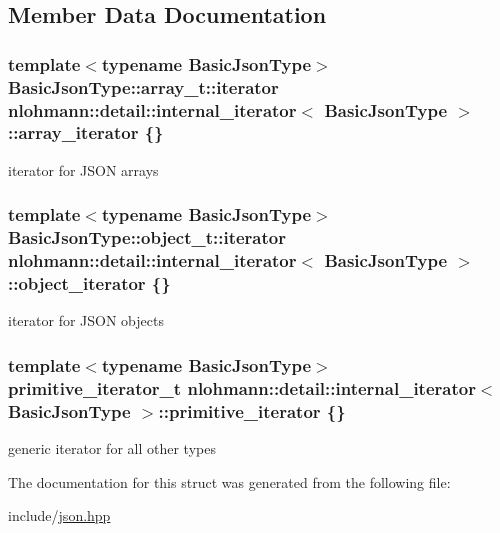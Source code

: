 \subsection{Member Data Documentation}
\subsubsection[{\texorpdfstring{array\+\_\+iterator}{array_iterator}}]{\setlength{\rightskip}{0pt plus 5cm}template$<$typename Basic\+Json\+Type$>$ Basic\+Json\+Type\+::array\+\_\+t\+::iterator {\bf nlohmann\+::detail\+::internal\+\_\+iterator}$<$ Basic\+Json\+Type $>$\+::array\+\_\+iterator \{\}}\hypertarget{structnlohmann_1_1detail_1_1internal__iterator_a8294a6e6f01b58e1cce8fbae66a50b5d}{}\label{structnlohmann_1_1detail_1_1internal__iterator_a8294a6e6f01b58e1cce8fbae66a50b5d}


iterator for J\+S\+ON arrays 

\subsubsection[{\texorpdfstring{object\+\_\+iterator}{object_iterator}}]{\setlength{\rightskip}{0pt plus 5cm}template$<$typename Basic\+Json\+Type$>$ Basic\+Json\+Type\+::object\+\_\+t\+::iterator {\bf nlohmann\+::detail\+::internal\+\_\+iterator}$<$ Basic\+Json\+Type $>$\+::object\+\_\+iterator \{\}}\hypertarget{structnlohmann_1_1detail_1_1internal__iterator_a8cb0af3498061426c1d0a65ad6220408}{}\label{structnlohmann_1_1detail_1_1internal__iterator_a8cb0af3498061426c1d0a65ad6220408}


iterator for J\+S\+ON objects 

\subsubsection[{\texorpdfstring{primitive\+\_\+iterator}{primitive_iterator}}]{\setlength{\rightskip}{0pt plus 5cm}template$<$typename Basic\+Json\+Type$>$ {\bf primitive\+\_\+iterator\+\_\+t} {\bf nlohmann\+::detail\+::internal\+\_\+iterator}$<$ Basic\+Json\+Type $>$\+::primitive\+\_\+iterator \{\}}\hypertarget{structnlohmann_1_1detail_1_1internal__iterator_a2b3bb45f968210e42c282017eeeb63a8}{}\label{structnlohmann_1_1detail_1_1internal__iterator_a2b3bb45f968210e42c282017eeeb63a8}


generic iterator for all other types 



The documentation for this struct was generated from the following file\+:\begin{DoxyCompactItemize}
\item 
include/\hyperlink{json_8hpp}{json.\+hpp}\end{DoxyCompactItemize}

